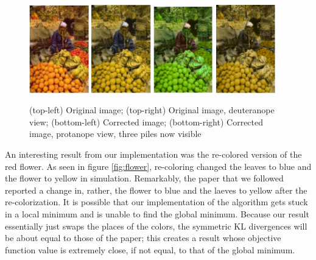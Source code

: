 \documentclass[10pt,twocolumn,letterpaper]{article}
\begin{document}
\begin{figure}[h]
  \includegraphics[width=0.23\textwidth]{fruits1.png}
  \includegraphics[width=0.23\textwidth]{fruits3.png}
  \includegraphics[width=0.23\textwidth]{fruits2.png}
  \includegraphics[width=0.23\textwidth]{fruits4.png}
  \caption{(top-left) Original image; (top-right) Original image, deuteranope view; (bottom-left) Corrected image; (bottom-right) Corrected image, protanope view, three piles now visible}
  \label{fig:fruits}
\end{figure}

An interesting result from our implementation was the re-colored version of the red flower. As seen in figure \ref{fig:flower}, re-coloring changed the leaves to blue and the flower to yellow in simulation. Remarkably, the paper that we followed reported a change in, rather, the flower to blue and the laeves to yellow after the re-colorization. It is possible that our implementation of the algorithm gets stuck in a local minimum and is unable to find the global minimum. Because our result essentially just swaps the places of the colors, the symmetric KL divergences will be about equal to those of the paper; this creates a result whose objective function value is extremely close, if not equal, to that of the global minimum. 
\end{document}
